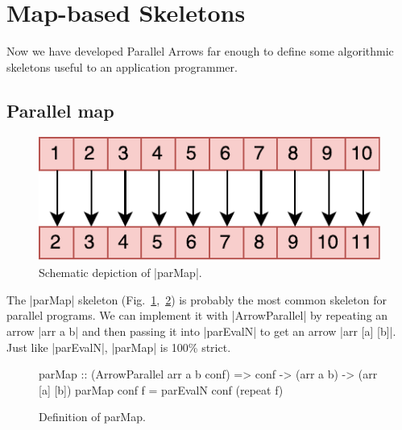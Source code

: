 
\section{Map-based Skeletons}
\label{sec:map-skeletons}
Now we have developed Parallel Arrows far enough to define some algorithmic skeletons useful to an application programmer.
\subsection{Parallel map}
\begin{figure}[h]
	\includegraphics[scale=0.7]{images/parMap}
	\caption{Schematic depiction of |parMap|.}
	\label{fig:parMapImg}
\end{figure}
The |parMap| skeleton (Fig.~\ref{fig:parMapImg},~\ref{fig:parMap}) is probably the most common skeleton for parallel programs. We can implement it with |ArrowParallel| by repeating an arrow |arr a b| and then passing it into |parEvalN| to get an arrow |arr [a] [b]|.
Just like |parEvalN|, |parMap| is 100\% strict.
\begin{figure}[h]
\begin{code}
parMap :: (ArrowParallel arr a b conf) => conf -> (arr a b) -> (arr [a] [b])
parMap conf f = parEvalN conf (repeat f)
\end{code}
\caption{Definition of parMap.}
\label{fig:parMap}
\end{figure}

